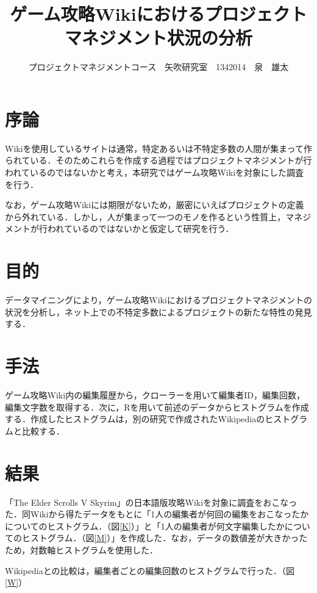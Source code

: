 \documentclass[uplatex,twocolumn,dvipdfmx]{jsarticle}
\title{\vspace{-5mm}\fontsize{14pt}{0pt}\selectfont  ゲーム攻略Wikiにおけるプロジェクトマネジメント状況の分析}
\author{\normalsize プロジェクトマネジメントコース　矢吹研究室　1342014　泉　雄太}
\date{}
\begin{document}
\fontsize{10.5pt}{\baselineskip}\selectfont
\maketitle





\section{序論}

Wikiを使用しているサイトは通常，特定あるいは不特定多数の人間が集まって作られている．そのためこれらを作成する過程ではプロジェクトマネジメントが行われているのではないかと考え，本研究ではゲーム攻略Wikiを対象にした調査を行う．

なお，ゲーム攻略Wikiには期限がないため，厳密にいえばプロジェクトの定義から外れている．しかし，人が集まって一つのモノを作るという性質上，マネジメントが行われているのではないかと仮定して研究を行う．


\section{目的}

データマイニングにより，ゲーム攻略Wikiにおけるプロジェクトマネジメントの状況を分析し，ネット上での不特定多数によるプロジェクトの新たな特性の発見する．

\section{手法}

ゲーム攻略Wiki内の編集履歴から，クローラーを用いて編集者ID，編集回数，編集文字数を取得する．次に，Rを用いて前述のデータからヒストグラムを作成する．作成したヒストグラムは，別の研究で作成されたWikipediaのヒストグラムと比較する．

\section{結果}


「The Elder Scrolls V Skyrim」の日本語版攻略Wiki\cite{wiki}を対象に調査をおこなった．同Wikiから得たデータをもとに「1人の編集者が何回の編集をおこなったかについてのヒストグラム．（図\ref{K}）」と「1人の編集者が何文字編集したかについてのヒストグラム．（図\ref{M}）」を作成した．なお，データの数値差が大きかったため，対数軸ヒストグラムを使用した．

Wikipediaとの比較は，編集者ごとの編集回数のヒストグラムで行った．（図\ref{W}）
\end{document}
